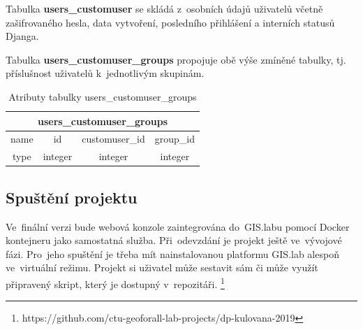 Tabulka \textbf{users\_customuser} se skládá z~osobních údajů uživatelů
včetně zašifrovaného hesla, data vytvoření, posledního přihlášení a
interních statusů Djanga.

\begin{table}[H]
\centering
{}
\caption{Atributy tabulky users\_customuser 1/2}
\label{tab:users-customuser-1}
\end{table}

\begin{table}[H]
\centering
{}
\caption{Atributy tabulky users\_customuser 2/2}
\label{tab:users-customuser-2}
\end{table}

Tabulka \textbf{users\_customuser\_groups} propojuje obě výše zmíněné
tabulky, tj. příslušnost uživatelů k~jednotlivým skupinám.

\begin{table}[H]
\centering
\begin{tabular}{@{}|c|c|c|c|@{}}
\toprule
\multicolumn{4}{|c|}{users\_customuser\_groups} \\ \midrule
name & id & customuser\_id & group\_id \\ \midrule
type & integer & integer & integer \\ \bottomrule
\end{tabular}
\caption{Atributy tabulky users\_customuser\_groups}
\label{tab:users-customuser-groups}
\end{table}

\subsection{Spuštění projektu}
Ve~finální verzi bude webová konzole zaintegrována do~GIS.labu pomocí
Docker kontejneru jako samostatná služba. Při~odevzdání je projekt
ještě ve~vývojové fázi. Pro~jeho spuštění je třeba mít nainstalovanou
platformu GIS.lab alespoň ve~virtuální režimu. Projekt si uživatel
může sestavit sám či může využít připravený skript, který je dostupný
v~repozitáři. \footnote{https://github.com/ctu-geoforall-lab-projects/dp-kulovana-2019}

